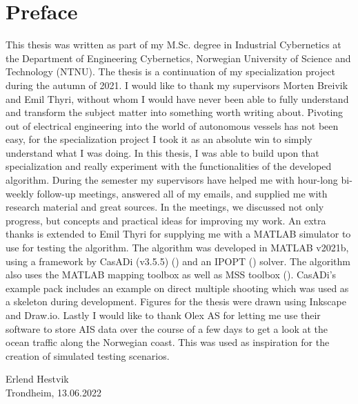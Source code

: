 \blankpage
\section*{Preface}

This thesis was written as part of my M.Sc. degree in Industrial Cybernetics
at the Department of Engineering Cybernetics, Norwegian University of Science
and Technology (NTNU). The thesis is a continuation of my specialization project during the autumn of 2021.
I would like to thank my supervisors Morten Breivik and Emil Thyri, without whom I would have
never been able to fully understand and transform the subject matter into something worth writing about.\newline
Pivoting out of electrical engineering into the world of autonomous vessels has not been easy, for
the specialization project I took it as an absolute win to simply understand what I was doing. In this 
thesis, I was able to build upon that specialization and really experiment with the functionalities of the developed
algorithm.\newline
During the semester my supervisors have helped me with hour-long bi-weekly follow-up meetings, answered
all of my emails, and supplied me with research material and great sources. In the meetings, we discussed
not only progress, but concepts and practical ideas for improving my work.\newline
An extra thanks is extended to Emil Thyri for supplying me with a MATLAB simulator to use for testing the algorithm.
The algorithm was developed in MATLAB v2021b, using a framework by CasADi (v3.5.5) (\cite{andersson2019casadi}) and an IPOPT (\cite{wachter2006implementation}) solver. The algorithm
also uses the MATLAB mapping toolbox as well as MSS toolbox (\cite{MSStoolbox}). CasADi's example pack includes an example on 
direct multiple shooting which was used as a skeleton during development. Figures for the thesis were drawn
using Inkscape and Draw.io. Lastly I would like to thank Olex AS for letting me use their software to store AIS data
over the course of a few days to get a look at the ocean traffic along the Norwegian coast. This was used as inspiration
for the creation of simulated testing scenarios.
\begin{center}
    Erlend Hestvik\\
    Trondheim, 13.06.2022
\end{center}

\afterpage{\blankpage}